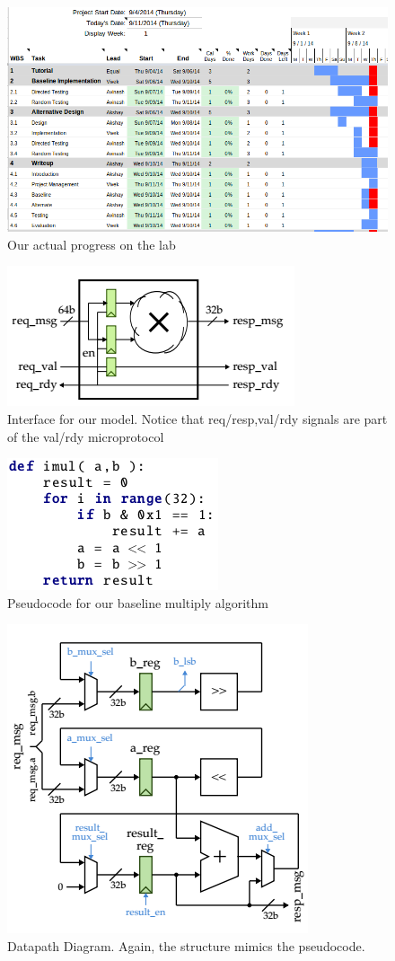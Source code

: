 \documentclass[11pt]{article}
\begin{document}
\begin{figure}
\centering
\includegraphics[scale=0.5]{gantt_actual}
\caption{Our actual progress on the lab}
\label{fig:gantt_actual}
\end{figure}



\begin{figure}[b]
\centering
\includegraphics[scale=0.5]{FLmodel}
\caption{Interface for our model. Notice that req/resp,val/rdy signals are part of the val/rdy microprotocol}
\label{fig:model}
\end{figure}

\begin{figure}[b]
\centering
\includegraphics[scale=0.9]{imul}
\caption{Pseudocode for our baseline multiply algorithm}
\label{fig:code}
\end{figure}

\begin{figure}[b]
\centering
\includegraphics[scale=0.6]{Datapath}
\caption{Datapath Diagram. Again, the structure mimics the pseudocode.}
\label{fig:datapath}
\end{figure}
\end{document}
